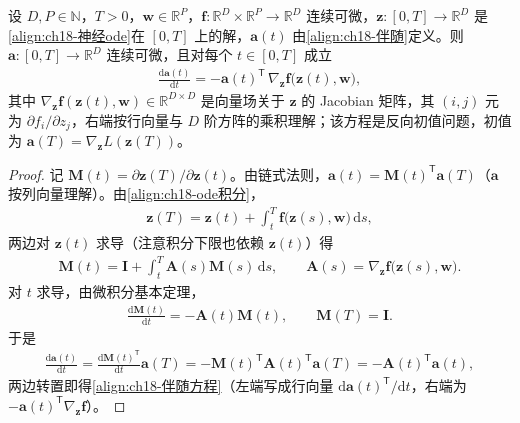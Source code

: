\documentclass[../../main.tex]{subfiles}
\begin{document}
\begin{proposition}[伴随方程]\label{proposition:ch18-伴随方程}
设 $D,P\in\mathbb{N}$，$T>0$，$\bm{w}\in\mathbb{R}^{P}$，$\bm{f}:\mathbb{R}^{D}\times\mathbb{R}^{P}\to\mathbb{R}^{D}$ 连续可微，$\bm{z}:[0,T]\to\mathbb{R}^{D}$ 是\eqref{align:ch18-神经ode}在 $[0,T]$ 上的解，$\bm{a}(t)$ 由\eqref{align:ch18-伴随}定义。则 $\bm{a}:[0,T]\to\mathbb{R}^{D}$ 连续可微，且对每个 $t\in[0,T]$ 成立
\begin{align}
  \frac{\mathrm{d}\bm{a}(t)}{\mathrm{d}t}=-\bm{a}(t)^{\mathsf T}\,\nabla_{\bm{z}}\bm{f}\big(\bm{z}(t),\bm{w}\big),\label{align:ch18-伴随方程}
\end{align}
其中 $\nabla_{\bm{z}}\bm{f}(\bm{z}(t),\bm{w})\in\mathbb{R}^{D\times D}$ 是向量场关于 $\bm{z}$ 的 Jacobian 矩阵，其 $(i,j)$ 元为 $\partial f_{i}/\partial z_{j}$，右端按行向量与 $D$ 阶方阵的乘积理解；该方程是反向初值问题，初值为 $\bm{a}(T)=\nabla_{\bm{z}}L(\bm{z}(T))$。
\end{proposition}

\begin{proof}
记 $\bm{M}(t)=\partial\bm{z}(T)/\partial\bm{z}(t)$。由链式法则，$\bm{a}(t)=\bm{M}(t)^{\mathsf T}\bm{a}(T)$（$\bm{a}$ 按列向量理解）。由\eqref{align:ch18-ode积分}，
\begin{align*}
  \bm{z}(T)=\bm{z}(t)+\int_{t}^{T}\bm{f}\big(\bm{z}(s),\bm{w}\big)\,\mathrm{d}s,
\end{align*}
两边对 $\bm{z}(t)$ 求导（注意积分下限也依赖 $\bm{z}(t)$）得
\begin{align*}
  \bm{M}(t)=\bm{I}+\int_{t}^{T}\bm{A}(s)\bm{M}(s)\,\mathrm{d}s,\qquad \bm{A}(s)=\nabla_{\bm{z}}\bm{f}\big(\bm{z}(s),\bm{w}\big).
\end{align*}
对 $t$ 求导，由微积分基本定理，
\begin{align*}
  \frac{\mathrm{d}\bm{M}(t)}{\mathrm{d}t}=-\bm{A}(t)\bm{M}(t),\qquad \bm{M}(T)=\bm{I}.
\end{align*}
于是
\begin{align*}
  \frac{\mathrm{d}\bm{a}(t)}{\mathrm{d}t}=\frac{\mathrm{d}\bm{M}(t)^{\mathsf T}}{\mathrm{d}t}\bm{a}(T)=-\bm{M}(t)^{\mathsf T}\bm{A}(t)^{\mathsf T}\bm{a}(T)=-\bm{A}(t)^{\mathsf T}\bm{a}(t),
\end{align*}
两边转置即得\eqref{align:ch18-伴随方程}（左端写成行向量 $\mathrm{d}\bm{a}(t)^{\mathsf T}/\mathrm{d}t$，右端为 $-\bm{a}(t)^{\mathsf T}\nabla_{\bm{z}}\bm{f}$）。
\end{proof}
\end{document}
